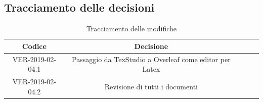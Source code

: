 \documentclass[12pt]{article}
\begin{document}
\begin{itemize}
    \subsection{Tracciamento delle decisioni}
    \begin{table}[!h] %
            \centering
            \renewcommand{\arraystretch}{2}
            \begin{tabular}{|c|c|p{6cm}|l|l|} %
                \rowcolor{orange!50} %
        		\hline
        		\textbf{Codice} & \textbf{Decisione}\\
                \hline
                VER-2019-02-04.1 & Passaggio da TexStudio a Overleaf come editor per Latex\\
                \hline
                VER-2019-02-04.2 & Revisione di tutti i documenti\\
                \hline
        \end{tabular}
        \caption{Tracciamento delle modifiche} %
        \label{tab:Tracciamento delle modifiche}
        \end{table}
    \end{itemize}
\end{document}
